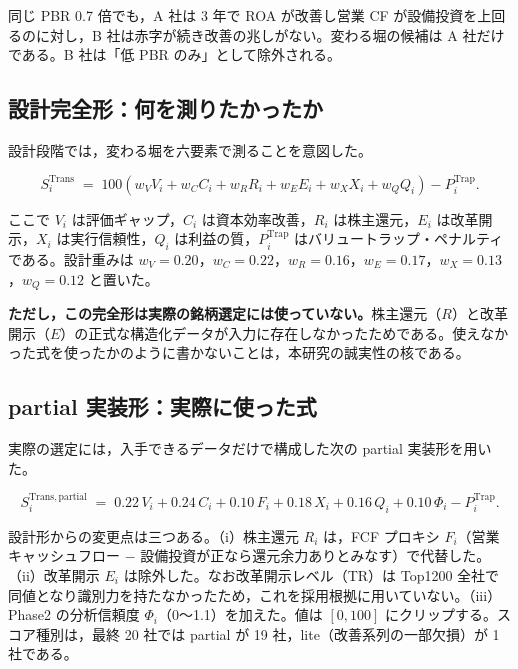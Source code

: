 \documentclass[a4paper,10pt]{article}
\begin{document}
\begin{defbox}
同じ PBR 0.7 倍でも，A 社は 3 年で ROA が改善し営業 CF が設備投資を上回るのに対し，B 社は赤字が続き改善の兆しがない。変わる堀の候補は A 社だけである。B 社は「低 PBR のみ」として除外される。
\end{defbox}

\subsection{設計完全形：何を測りたかったか}

設計段階では，変わる堀を六要素で測ることを意図した。

\begin{equation}
S^{\mathrm{Trans}}_i \;=\; 100\left(w_V V_i + w_C C_i + w_R R_i + w_E E_i + w_X X_i + w_Q Q_i\right) - P^{\mathrm{Trap}}_i.
\label{eq:trans-design}
\end{equation}

ここで $V_i$ は評価ギャップ，$C_i$ は資本効率改善，$R_i$ は株主還元，$E_i$ は改革開示，$X_i$ は実行信頼性，$Q_i$ は利益の質，$P^{\mathrm{Trap}}_i$ はバリュートラップ・ペナルティである。設計重みは $w_V{=}0.20$，$w_C{=}0.22$，$w_R{=}0.16$，$w_E{=}0.17$，$w_X{=}0.13$，$w_Q{=}0.12$ と置いた。

\textbf{ただし，この完全形は実際の銘柄選定には使っていない。}株主還元（$R$）と改革開示（$E$）の正式な構造化データが入力に存在しなかったためである。使えなかった式を使ったかのように書かないことは，本研究の誠実性の核である。

\subsection{partial 実装形：実際に使った式}

実際の選定には，入手できるデータだけで構成した次の partial 実装形を用いた。

\begin{equation}
S^{\mathrm{Trans,partial}}_i \;=\; 0.22\,V_i + 0.24\,C_i + 0.10\,F_i + 0.18\,X_i + 0.16\,Q_i + 0.10\,\Phi_i - P^{\mathrm{Trap}}_i.
\label{eq:trans-partial}
\end{equation}

設計形からの変更点は三つある。（i）株主還元 $R_i$ は，FCF プロキシ $F_i$（営業キャッシュフロー $-$ 設備投資が正なら還元余力ありとみなす）で代替した。（ii）改革開示 $E_i$ は除外した。なお改革開示レベル（TR）は Top1200 全社で同値となり識別力を持たなかったため，これを採用根拠に用いていない。（iii）Phase2 の分析信頼度 $\Phi_i$（0〜1.1）を加えた。値は $[0,100]$ にクリップする。スコア種別は，最終 20 社では partial が 19 社，lite（改善系列の一部欠損）が 1 社である。
\end{document}

